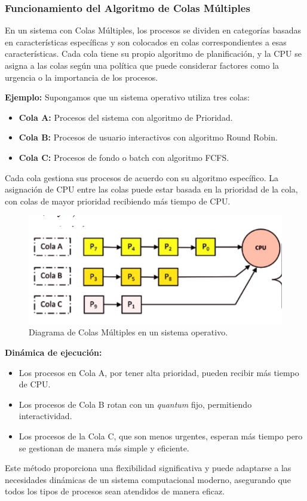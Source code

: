 \subsubsection{Funcionamiento del Algoritmo de Colas Múltiples}

En un sistema con Colas Múltiples, los procesos se dividen en categorías basadas en características específicas y son colocados en colas correspondientes a esas características. Cada cola tiene su propio algoritmo de planificación, y la CPU se asigna a las colas según una política que puede considerar factores como la urgencia o la importancia de los procesos.

\textbf{Ejemplo:}
Supongamos que un sistema operativo utiliza tres colas:
\begin{itemize}
	\item \textbf{Cola A:} Procesos del sistema con algoritmo de Prioridad.
	\item \textbf{Cola B:} Procesos de usuario interactivos con algoritmo Round Robin.
	\item \textbf{Cola C:} Procesos de fondo o batch con algoritmo FCFS.
\end{itemize}

Cada cola gestiona sus procesos de acuerdo con su algoritmo específico. La asignación de CPU entre las colas puede estar basada en la prioridad de la cola, con colas de mayor prioridad recibiendo más tiempo de CPU.

\begin{figure}[H]
	\centering
	\includegraphics[width=0.8\linewidth]{Imagenes/colas.png}
	\caption{Diagrama de Colas Múltiples en un sistema operativo.}
\end{figure}

\textbf{Dinámica de ejecución:}

\begin{itemize}
	\item Los procesos en Cola A, por tener alta prioridad, pueden recibir más tiempo de CPU. 
	\item Los procesos de Cola B rotan con un \textit{quantum} fijo, permitiendo interactividad.
	\item Los procesos de la Cola C, que son menos urgentes, esperan más tiempo pero se gestionan de manera más simple y eficiente.
\end{itemize}

Este método proporciona una flexibilidad significativa y puede adaptarse a las necesidades dinámicas de un sistema computacional moderno, asegurando que todos los tipos de procesos sean atendidos de manera eficaz.


